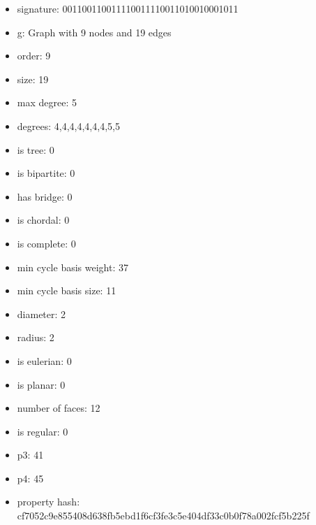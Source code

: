 \newpage
\begin{figure}
\end{figure}
\begin{itemize}
\item signature: 001100110011110011110011010010001011
\item g: Graph with 9 nodes and 19 edges
\item order: 9
\item size: 19
\item max degree: 5
\item degrees: 4,4,4,4,4,4,4,5,5
\item is tree: 0
\item is bipartite: 0
\item has bridge: 0
\item is chordal: 0
\item is complete: 0
\item min cycle basis weight: 37
\item min cycle basis size: 11
\item diameter: 2
\item radius: 2
\item is eulerian: 0
\item is planar: 0
\item number of faces: 12
\item is regular: 0
\item p3: 41
\item p4: 45
\item property hash: cf7052c9e855408d638fb5ebd1f6cf3fe3c5e404df33c0b0f78a002fcf5b225f
\end{itemize}
